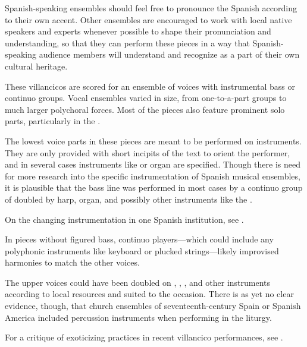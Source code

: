 
Spanish-speaking ensembles should feel free to pronounce the Spanish according
to their own accent.
Other ensembles are encouraged to work with local native speakers and experts
whenever possible to shape their pronunciation and understanding, so that they
can perform these pieces in a way that Spanish-speaking audience members will
understand and recognize as a part of their own cultural heritage.

These villancicos are scored for an ensemble of voices with instrumental bass 
or continuo groups.
Vocal ensembles varied in size, from one-to-a-part groups to much larger 
polychoral forces.
Most of the pieces also feature prominent solo parts, particularly in the 
.

The lowest voice parts in these pieces are meant to be performed on instruments. 
They are only provided with short incipits of the text to orient the 
performer, and in several cases instruments like  or organ are specified.
Though there is need for more research into the specific instrumentation of 
Spanish musical ensembles, it is plausible that the bass line was performed in 
most cases by a continuo group of  doubled by harp, organ, and 
possibly other instruments like the .%
\begin{Footnote}
    On the changing instrumentation in one Spanish institution, see 
    \autocite{Torrente:PhD}.
\end{Footnote}
In pieces without figured bass, continuo players---which could include any
polyphonic instruments like keyboard or plucked strings---likely improvised
harmonies to match the other voices.

The upper voices could have been doubled on ,
, , and other instruments
according to local resources and suited to the occasion.
There is as yet no clear evidence, though, that church ensembles of 
seventeenth-century Spain or Spanish America included percussion instruments
when performing in the liturgy.%
\begin{Footnote}
    For a critique of exoticizing practices in recent villancico performances,  
    see \autocites{Baker:PerformancePostColonial}{Davies:LocalContent}.
\end{Footnote}

